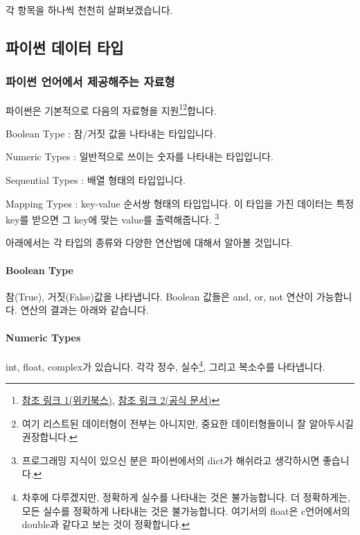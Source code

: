 \documentclass[twoside]{article}
\begin{document}
각 항목을 하나씩 천천히 살펴보겠습니다. 

\subsection{파이썬 데이터 타입} 

\subsubsection{파이썬 언어에서 제공해주는 자료형} 

파이썬은 기본적으로 다음의 자료형을 지원\footnote{\href{https://en.wikibooks.org/wiki/Python\_Programming/Data\_Types}{참조 링크 1(위키북스)}, \href{https://docs.python.org/3/library/stdtypes.html}{참조 링크 2(공식 문서)}}\footnote{여기 리스트된 데이터형이 전부는 아니지만, 중요한 데이터형들이니 잘 알아두시길 권장합니다.}합니다. 

\begin{compactitem} 
\item Boolean Type : 참/거짓 값을 나타내는 타입입니다. 
\item Numeric Types : 일반적으로 쓰이는 숫자를 나타내는 타입입니다. 
\item Sequential Types : 배열 형태의 타입입니다. 
\item Mapping Types : key-value 순서쌍 형태의 타입입니다. 이 타입을 가진 데이터는 특정 key를 받으면 그 key에 맞는 value를 출력해줍니다. \footnote{프로그래밍 지식이 있으신 분은 파이썬에서의 dict가 해쉬라고 생각하시면 좋습니다.}
\end{compactitem}

아래에서는 각 타입의 종류와 다양한 연산법에 대해서 알아볼 것입니다. 


\paragraph{Boolean Type} 참(True), 거짓(False)값을 나타냅니다. Boolean 값들은 and, or, not 연산이 가능합니다. 연산의 결과는 아래와 같습니다. 




\paragraph{Numeric Types} int, float, complex가 있습니다. 각각 정수, 실수\footnote{차후에 다루겠지만, 정확하게 실수를 나타내는 것은 불가능합니다. 더 정확하게는, 모든 실수를 정확하게 나타내는 것은 불가능합니다. 여기서의 float은 c언어에서의 double과 같다고 보는 것이 정확합니다.}, 그리고 복소수를 나타냅니다. 
\end{document}
